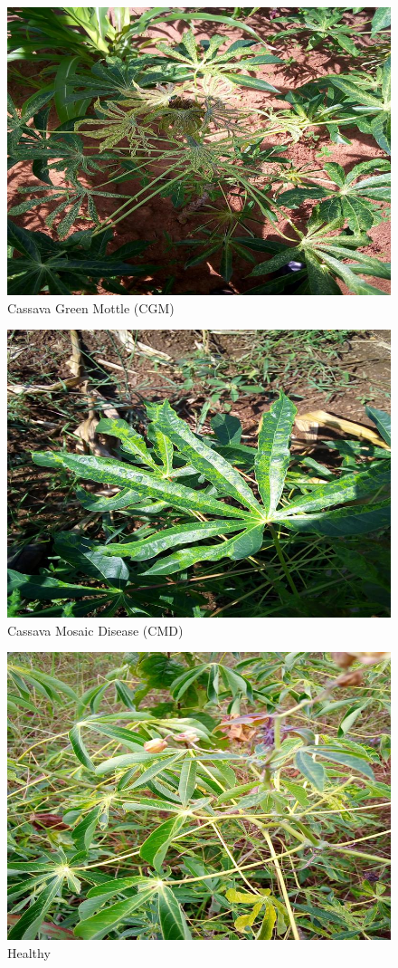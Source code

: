 \begin{figure}[H]
    \centering
    \includegraphics[width=0.7\linewidth]{figures/cgm.jpg}
    \caption{Cassava Green Mottle (CGM)}
    \label{fig:cgm}
\end{figure}

\begin{figure}[H]
    \centering
    \includegraphics[width=0.7\linewidth]{figures/cmd.jpg}
    \caption{Cassava Mosaic Disease (CMD)}
    \label{fig:cmd}
\end{figure}

\begin{figure}[H]
    \centering
    \includegraphics[width=0.7\linewidth]{figures/healthy.jpg}
    \caption{Healthy}
    \label{fig:healthy}
\end{figure}

